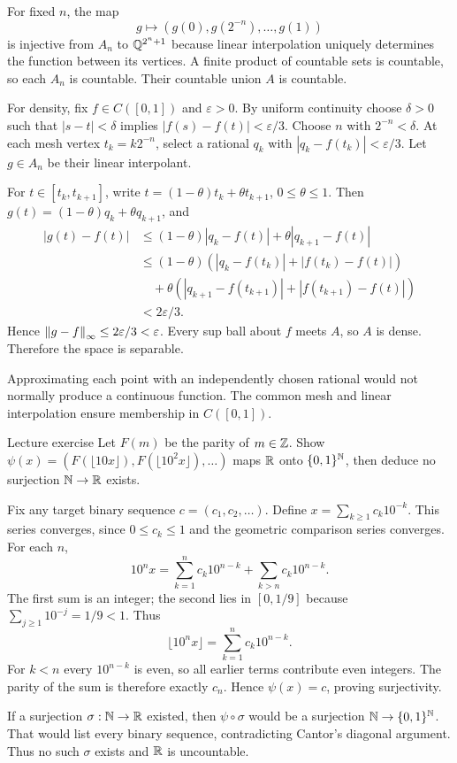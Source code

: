 \begin{answer}
For fixed $n$, the map
\[g\longmapsto(g(0),g(2^{-n}),\ldots,g(1))\]
is injective from $A_n$ to $\mathbb Q^{2^n+1}$ because linear interpolation uniquely determines the function between its vertices. A finite product of countable sets is countable, so each $A_n$ is countable. Their countable union $A$ is countable.

For density, fix $f\in C([0,1])$ and $\varepsilon>0$. By uniform continuity choose $\delta>0$ such that $|s-t|<\delta$ implies $|f(s)-f(t)|<\varepsilon/3$. Choose $n$ with $2^{-n}<\delta$. At each mesh vertex $t_k=k2^{-n}$, select a rational $q_k$ with $|q_k-f(t_k)|<\varepsilon/3$. Let $g\in A_n$ be their linear interpolant.

For $t\in[t_k,t_{k+1}]$, write $t=(1-\theta)t_k+\theta t_{k+1}$, $0\le\theta\le1$. Then $g(t)=(1-\theta)q_k+\theta q_{k+1}$, and
\begin{align*}
|g(t)-f(t)|&\le(1-\theta)|q_k-f(t)|+\theta|q_{k+1}-f(t)|\\
&\le(1-\theta)(|q_k-f(t_k)|+|f(t_k)-f(t)|)\\
&\quad+\theta(|q_{k+1}-f(t_{k+1})|+|f(t_{k+1})-f(t)|)\\
&<2\varepsilon/3.
\end{align*}
Hence $\left\lVert g-f\right\rVert_\infty\le2\varepsilon/3<\varepsilon$. Every sup ball about $f$ meets $A$, so $A$ is dense. Therefore the space is separable.
\end{answer}
\begin{tip}
Approximating each point with an independently chosen rational would not normally produce a continuous function. The common mesh and linear interpolation ensure membership in $C([0,1])$.
\end{tip}
\begin{exam}{Lecture exercise}
Let $F(m)$ be the parity of $m\in\mathbb Z$. Show $\psi(x)=(F(\lfloor10x\rfloor),F(\lfloor10^2x\rfloor),\ldots)$ maps $\mathbb R$ onto $\{0,1\}^{\mathbb N}$, then deduce no surjection $\mathbb N\to\mathbb R$ exists.
\end{exam}
\begin{answer}
Fix any target binary sequence $c=(c_1,c_2,\ldots)$. Define $x=\sum_{k\ge1}c_k10^{-k}$. This series converges, since $0\le c_k\le1$ and the geometric comparison series converges. For each $n$,
\[10^nx=\sum_{k=1}^nc_k10^{n-k}+\sum_{k>n}c_k10^{n-k}.\]
The first sum is an integer; the second lies in $[0,1/9]$ because $\sum_{j\ge1}10^{-j}=1/9<1$. Thus
\[\lfloor10^nx\rfloor=\sum_{k=1}^nc_k10^{n-k}.\]
For $k<n$ every $10^{n-k}$ is even, so all earlier terms contribute even integers. The parity of the sum is therefore exactly $c_n$. Hence $\psi(x)=c$, proving surjectivity.

If a surjection $\sigma:\mathbb N\to\mathbb R$ existed, then $\psi\circ\sigma$ would be a surjection $\mathbb N\to\{0,1\}^{\mathbb N}$. That would list every binary sequence, contradicting Cantor's diagonal argument. Thus no such $\sigma$ exists and $\mathbb R$ is uncountable.
\end{answer}

